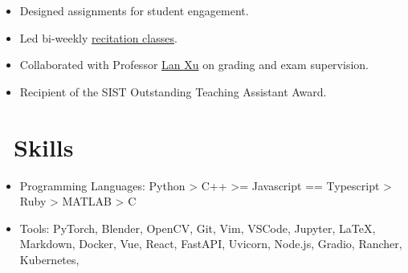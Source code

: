 \documentclass{resume}
\begin{document}
\begin{itemize}
  \item Designed assignments for student engagement.
  \item Led bi-weekly \href{https://github.com/GKxxQAQ/CS100-recitations-spring2023}{recitation classes}.
  \item Collaborated with Professor \href{https://www.xu-lan.com/}{Lan Xu} on grading and exam supervision.
  \item Recipient of the SIST Outstanding Teaching Assistant Award.
\end{itemize}



\section{\faCogs\ Skills}
\begin{itemize}[parsep=0.5ex]
  \item Programming Languages: Python > C++ >= Javascript == Typescript > Ruby > MATLAB > C
  \item Tools: PyTorch, Blender, OpenCV, Git, Vim, VSCode, Jupyter, \LaTeX, Markdown, Docker, Vue, React, FastAPI, Uvicorn, Node.js, Gradio, Rancher, Kubernetes, 
\end{itemize}

%
%
\end{document}
